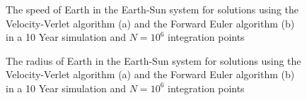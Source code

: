 \documentclass[10pt,showpacs,preprintnumbers,footinbib,amsmath,amssymb,aps,prl,twocolumn,groupedaddress,superscriptaddress,showkeys]{revtex4-1}
\begin{document}
\begin{figure}
  \center
   \caption{The speed of Earth in the Earth-Sun system for solutions using the Velocity-Verlet algorithm (a) and the Forward Euler algorithm (b) in a 10 Year simulation and $N=10^6$ integration points}
   \label{fig:c_speed}
\end{figure}
\begin{figure}
  \center
   \caption{The radius of Earth in the Earth-Sun system for solutions using the Velocity-Verlet algorithm (a) and the Forward Euler algorithm (b) in a 10 Year simulation and $N=10^6$ integration points}
   \label{fig:c_radius}
\end{figure}
\end{document}

